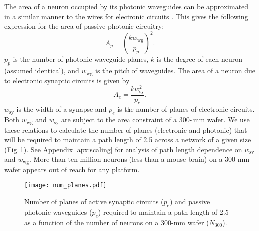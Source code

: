 \documentclass[twocolumn]{article}
\begin{document}
The area of a neuron occupied by its photonic waveguides can be approximated in a similar manner to the wires for electronic circuits \cite{ke1982}. This gives the following expression for the area of passive photonic circuitry:
\begin{equation}
\label{eq:area_p}
A_p = \left( \frac{k w_{\mathrm{wg}}}{p_p} \right)^2.
\end{equation}
$p_p$ is the number of photonic waveguide planes, $k$ is the degree of each neuron (assumed identical), and $w_{\mathrm{wg}}$ is the pitch of waveguides. The area of a neuron due to electronic synaptic circuits is given by
\begin{equation}
\label{eq:area_e}
A_e = \frac{k w_{\mathrm{sy}}^2}{p_e}.
\end{equation}
$w_{\mathrm{sy}}$ is the width of a synapse and $p_e$ is the number of planes of electronic circuits. Both $w_{\mathrm{wg}}$ and $w_{\mathrm{sy}}$ are subject to the area constraint of a 300-\,mm wafer. We use these relations to calculate the number of planes (electronic and photonic) that will be required to maintain a path length of 2.5 across a network of a given size (Fig.\,\ref{fig:num_planes}). See Appendix \ref{apx:scaling} for analysis of path length dependence on $w_{\mathrm{sy}}$ and $w_{\mathrm{wg}}$. More than ten million neurons (less than a mouse brain) on a 300-mm wafer appears out of reach for any platform.

\begin{figure}
    \centering
    \texttt{[image: num\_planes.pdf]} 
    \caption{Number of planes of active synaptic circuits ($p_e$) and passive photonic waveguides ($p_e$) required to maintain a path length of 2.5 as a function of the number of neurons on a 300-mm wafer ($N_{300}$).}
    \label{fig:num_planes}
\end{figure}
\end{document}
